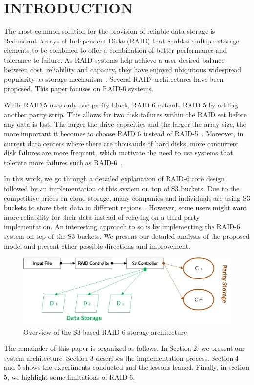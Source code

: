 \section{INTRODUCTION}
\label{sec:intro}

The  most  common  solution  for  the  provision  of  reliable data  storage  is  Redundant Arrays of Independent Disks (RAID) that enables multiple storage elements to be combined to offer a combination of better performance and tolerance to failure.
As RAID systems help achieve a user desired balance between cost, reliability and capacity, they have enjoyed ubiquitous widespread popularity as storage mechanism~\cite{raid_survey}. Several RAID architectures have been proposed. This paper focuses on RAID-6 systems.

While RAID-5 uses only one parity block, RAID-6 extends RAID-5 by adding another parity strip. This allows for two disk failures within the RAID set before any data is lost. The larger the drive capacities and the larger the array size, the more important it becomes to choose RAID 6 instead of RAID-5~\cite{raid6_stop_2019}. Moreover, in current data centers where there are thousands of hard disks, more concurrent disk failures are more frequent, which motivate the need to use systems that tolerate more failures such as RAID-6~\cite{Failure_Trends_2007}.

In this work, we go through a detailed explanation of RAID-6 core design followed by an implementation of this system on top of S3 buckets. Due to the competitive prices on cloud storage, many companies and individuals are using S3 buckets to store their data in different regions~\cite{cloud_2020}. However, some users might want more reliability for their data instead of relaying on a third party implementation. An interesting approach to so is by implementing the RAID-6 system on top of the S3 buckets. We present our detailed analysis of the proposed model and present other possible directions and improvement. 



\begin{figure}
    \centering
    \includegraphics[width=\textwidth]{figures/over_0.jpg}
    \caption {Overview of the S3 based RAID-6 storage architecture}
    \label{fig:overview}
\end{figure}




The remainder of this paper is organized as follows. In
Section 2, we present our system architecture. Section
3 describes the implementation process. Section 4 and 5 shows
the experiments conducted and the lessons leaned. Finally, in
section 5, we highlight some limitations of RAID-6.




